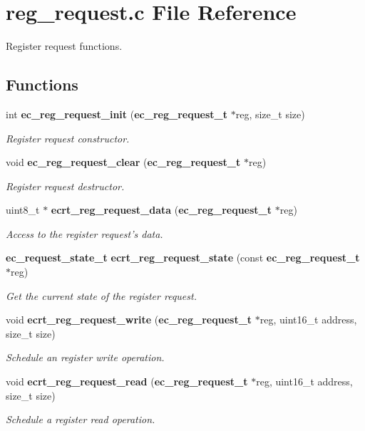 \section{reg\-\_\-request.\-c File Reference}
\label{reg__request_8c}


Register request functions.  


\subsection*{Functions}
\begin{DoxyCompactItemize}
\item 
int {\bf ec\-\_\-reg\-\_\-request\-\_\-init} ({\bf ec\-\_\-reg\-\_\-request\-\_\-t} $\ast$reg, size\-\_\-t size)
\begin{DoxyCompactList}\small\item\em Register request constructor. \end{DoxyCompactList}\item 
void {\bf ec\-\_\-reg\-\_\-request\-\_\-clear} ({\bf ec\-\_\-reg\-\_\-request\-\_\-t} $\ast$reg)
\begin{DoxyCompactList}\small\item\em Register request destructor. \end{DoxyCompactList}\item 
uint8\-\_\-t $\ast$ {\bf ecrt\-\_\-reg\-\_\-request\-\_\-data} ({\bf ec\-\_\-reg\-\_\-request\-\_\-t} $\ast$reg)
\begin{DoxyCompactList}\small\item\em Access to the register request's data. \end{DoxyCompactList}\item 
{\bf ec\-\_\-request\-\_\-state\-\_\-t} {\bf ecrt\-\_\-reg\-\_\-request\-\_\-state} (const {\bf ec\-\_\-reg\-\_\-request\-\_\-t} $\ast$reg)
\begin{DoxyCompactList}\small\item\em Get the current state of the register request. \end{DoxyCompactList}\item 
void {\bf ecrt\-\_\-reg\-\_\-request\-\_\-write} ({\bf ec\-\_\-reg\-\_\-request\-\_\-t} $\ast$reg, uint16\-\_\-t address, size\-\_\-t size)
\begin{DoxyCompactList}\small\item\em Schedule an register write operation. \end{DoxyCompactList}\item 
void {\bf ecrt\-\_\-reg\-\_\-request\-\_\-read} ({\bf ec\-\_\-reg\-\_\-request\-\_\-t} $\ast$reg, uint16\-\_\-t address, size\-\_\-t size)
\begin{DoxyCompactList}\small\item\em Schedule a register read operation. \end{DoxyCompactList}\end{DoxyCompactItemize}


